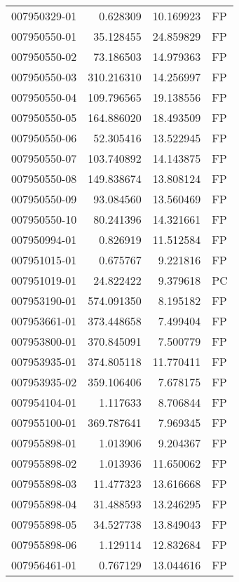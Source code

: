 \begin{tabular}{lrrl}
007950329-01 &    0.628309 &      10.169923 &   FP \\
007950550-01 &   35.128455 &      24.859829 &   FP \\
007950550-02 &   73.186503 &      14.979363 &   FP \\
007950550-03 &  310.216310 &      14.256997 &   FP \\
007950550-04 &  109.796565 &      19.138556 &   FP \\
007950550-05 &  164.886020 &      18.493509 &   FP \\
007950550-06 &   52.305416 &      13.522945 &   FP \\
007950550-07 &  103.740892 &      14.143875 &   FP \\
007950550-08 &  149.838674 &      13.808124 &   FP \\
007950550-09 &   93.084560 &      13.560469 &   FP \\
007950550-10 &   80.241396 &      14.321661 &   FP \\
007950994-01 &    0.826919 &      11.512584 &   FP \\
007951015-01 &    0.675767 &       9.221816 &   FP \\
007951019-01 &   24.822422 &       9.379618 &   PC \\
007953190-01 &  574.091350 &       8.195182 &   FP \\
007953661-01 &  373.448658 &       7.499404 &   FP \\
007953800-01 &  370.845091 &       7.500779 &   FP \\
007953935-01 &  374.805118 &      11.770411 &   FP \\
007953935-02 &  359.106406 &       7.678175 &   FP \\
007954104-01 &    1.117633 &       8.706844 &   FP \\
007955100-01 &  369.787641 &       7.969345 &   FP \\
007955898-01 &    1.013906 &       9.204367 &   FP \\
007955898-02 &    1.013936 &      11.650062 &   FP \\
007955898-03 &   11.477323 &      13.616668 &   FP \\
007955898-04 &   31.488593 &      13.246295 &   FP \\
007955898-05 &   34.527738 &      13.849043 &   FP \\
007955898-06 &    1.129114 &      12.832684 &   FP \\
007956461-01 &    0.767129 &      13.044616 &   FP \\

\end{tabular}
